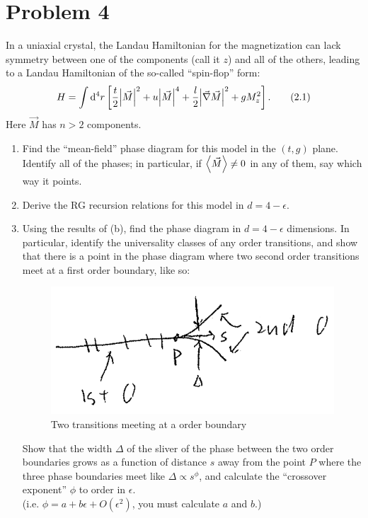 \documentclass[12pt]{article}
\begin{document}
\section*{Problem 4}
In a uniaxial crystal, the Landau Hamiltonian for the magnetization can lack symmetry between one of the components (call it $z$) and all of the others, leading to a Landau Hamiltonian of the so-called ``spin-flop'' form:
\begin{equation}
    H = \int \dd^4 r \left[ \frac{t}{2}\abs{\vec{M}}^2 + u\abs{\vec{M}}^4 + \frac{l}{2}\abs{\vec{\nabla}\vec{M}}^2 + gM_z^2 \right].
    \label{2.1}
    \tag{2.1}
\end{equation}
Here $\vec{M}$ has $n>2$ components.
\begin{enumerate}[label=(\alph*)]
    \item Find the ``mean-field'' phase diagram for this model in the $(t,g)$ plane. Identify all of the phases; in particular, if $\ev{\vec{M}} \neq 0$ in any of them, say which way it points.
    \item Derive the RG recursion relations for this model in $d=4-\epsilon$.
    \item Using the results of (b), find the phase diagram in $d=4-\epsilon$ dimensions. In particular, identify the universality classes of any  order transitions, and show that there is a point in the phase diagram where two second order transitions meet at a first order boundary, like so:
    \begin{figure}[H]
        \includegraphics[scale=1]{fig2}
        \centering
        \caption{Two  transitions meeting at a  order boundary}
        \label{fig2}
    \end{figure}
    Show that the width $\Delta$ of the sliver of the phase between the two  order boundaries grows as a function of distance $s$ away from the point $P$ where the three phase boundaries meet like $\Delta \propto s^\phi$, and calculate the ``crossover exponent'' $\phi$ to  order in $\epsilon$. \\
    (i.e. $\phi = a + b\epsilon + O(\epsilon^2)$, you must calculate $a$ and $b$.)
\end{enumerate}
\end{document}
